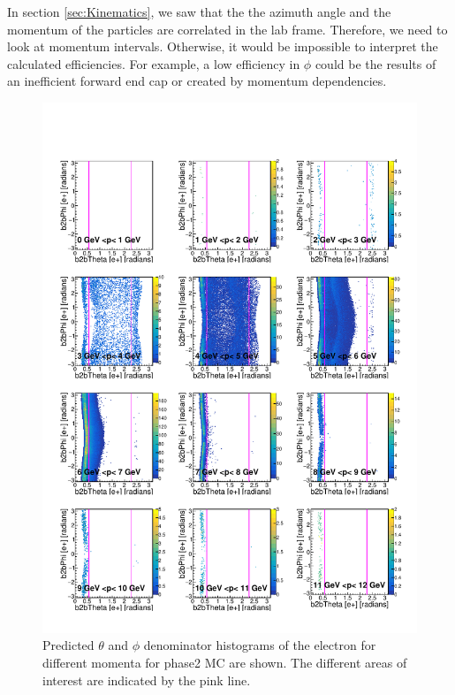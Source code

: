 \documentclass[a4paper,11pt,twosided,final,german,openbib,pdftex,listof=totoc,bibliography=totoc]{scrbook}
\begin{document}
In section \ref{sec:Kinematics}, we saw that the the azimuth angle and the momentum of the particles are correlated in the lab frame. Therefore, we need to look at momentum intervals. Otherwise, it would be impossible to interpret the calculated efficiencies. For example, a low efficiency in $\phi$ could be the results of an inefficient forward end cap or created by momentum dependencies.




\begin{figure}[h!]
	\includegraphics[width=\textwidth]{Plots/master/RTPMemD_MC.pdf}
	\caption[Denominator $\theta$-$\phi$ Electron Momentum MC]{Predicted $\theta$ and $\phi$ denominator histograms of the electron for different momenta for phase2 MC are shown. The different areas of interest are indicated by the pink line.}
	\label{plt:RTPMemD_MC}
\end{figure}
\end{document}

